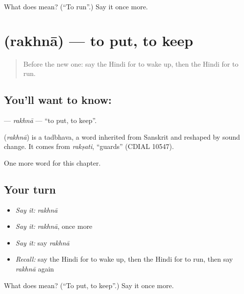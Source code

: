 \begin{tcolorbox}[breakable,colback=teal!4,colframe=teal!35!black,title={Before you move on}]
What does  mean? (\textquotedblleft{}To run\textquotedblright{}.) Say it once more.
\end{tcolorbox}
\section[\texorpdfstring{\hi{रखना} (rakhnā)}{रखना (rakhnā)}]{ (rakhnā) — to put, to keep}

\label{lesson:HI-C159-rakhna}



\begin{quote}
Before the new one: say the Hindi for to wake up, then the Hindi for to run.
\end{quote}

\subsection*{You'll want to know: }
\textbf{} — \emph{rakhnā} — \textquotedblleft{}to put, to keep\textquotedblright{}.

\begin{cousinweb}
\textbf{} (\emph{rakhnā}) is a tadbhava, a word inherited from Sanskrit and reshaped by sound change. It comes from \emph{rakṣati}, \textquotedblleft{}guards\textquotedblright{} (CDIAL 10547).
\end{cousinweb}

\begin{grammarlens}[title={What you've built}]
One more word for this chapter.
\end{grammarlens}

\subsection*{Your turn}
\begin{itemize}
\raggedright
  \item \emph{Say it:} \emph{rakhnā}
  \item \emph{Say it:} \emph{rakhnā}, once more
  \item \emph{Say it:} say \emph{rakhnā}
  \item \emph{Recall:} say the Hindi for to wake up, then the Hindi for to run, then say \emph{rakhnā} again
\end{itemize}

\begin{tcolorbox}[breakable,colback=teal!4,colframe=teal!35!black,title={Before you move on}]
What does  mean? (\textquotedblleft{}To put, to keep\textquotedblright{}.) Say it once more.
\end{tcolorbox}
